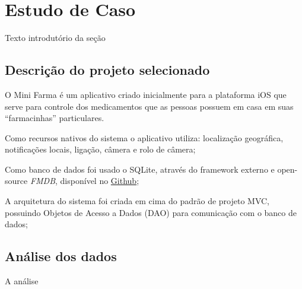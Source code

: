 \chapter{Estudo de Caso} \label{estudodecaso}

Texto introdutório da seção

\section{Descrição do projeto selecionado} \label{subsec:descricaodoprojeto}

O Mini Farma é um aplicativo criado inicialmente para a plataforma iOS que serve para controle dos medicamentos que as 
pessoas possuem em casa em suas ``farmacinhas'' particulares.


Como recursos nativos do sistema o aplicativo utiliza: localização geográfica, notificações locais, ligação, câmera e rolo de câmera;


Como banco de dados foi usado o SQLite, através do framework externo e open-source \textit{FMDB}, 
disponível no \href{https://github.com/ccgus/fmdb}{Github};

A arquitetura do sistema foi criada em cima do padrão de projeto MVC, 
possuindo Objetos de Acesso a Dados (DAO) para comunicação com o banco de dados;


\section{Análise dos dados} \label{sec:analise}

A análise